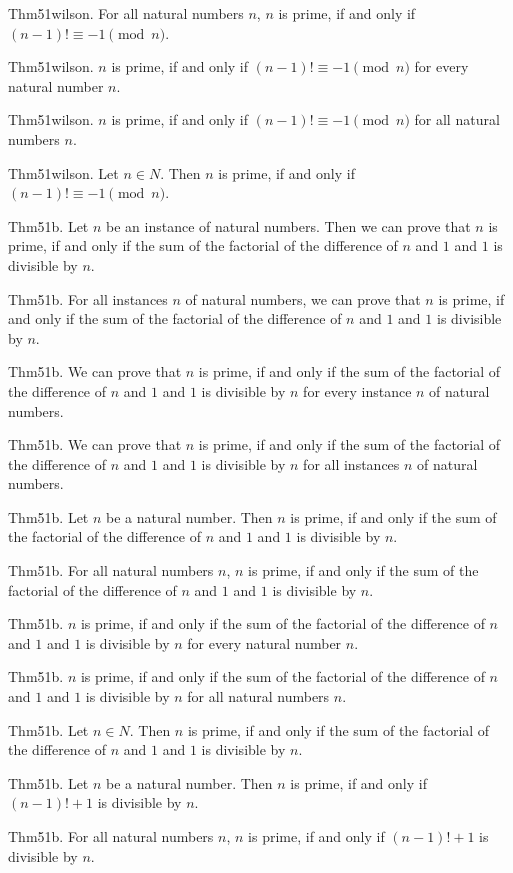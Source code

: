 \documentclass{article}
\begin{document}
Thm51wilson. For all natural numbers $n$, $n$ is prime, if and only if $(n - 1)! \equiv - 1 \pmod{ n}$.

Thm51wilson. $n$ is prime, if and only if $(n - 1)! \equiv - 1 \pmod{ n}$ for every natural number $n$.

Thm51wilson. $n$ is prime, if and only if $(n - 1)! \equiv - 1 \pmod{ n}$ for all natural numbers $n$.

Thm51wilson. Let $n \in N$. Then $n$ is prime, if and only if $(n - 1)! \equiv - 1 \pmod{ n}$.

Thm51b. Let $n$ be an instance of natural numbers. Then we can prove that $n$ is prime, if and only if the sum of the factorial of the difference of $n$ and $1$ and $1$ is divisible by $n$.

Thm51b. For all instances $n$ of natural numbers, we can prove that $n$ is prime, if and only if the sum of the factorial of the difference of $n$ and $1$ and $1$ is divisible by $n$.

Thm51b. We can prove that $n$ is prime, if and only if the sum of the factorial of the difference of $n$ and $1$ and $1$ is divisible by $n$ for every instance $n$ of natural numbers.

Thm51b. We can prove that $n$ is prime, if and only if the sum of the factorial of the difference of $n$ and $1$ and $1$ is divisible by $n$ for all instances $n$ of natural numbers.

Thm51b. Let $n$ be a natural number. Then $n$ is prime, if and only if the sum of the factorial of the difference of $n$ and $1$ and $1$ is divisible by $n$.

Thm51b. For all natural numbers $n$, $n$ is prime, if and only if the sum of the factorial of the difference of $n$ and $1$ and $1$ is divisible by $n$.

Thm51b. $n$ is prime, if and only if the sum of the factorial of the difference of $n$ and $1$ and $1$ is divisible by $n$ for every natural number $n$.

Thm51b. $n$ is prime, if and only if the sum of the factorial of the difference of $n$ and $1$ and $1$ is divisible by $n$ for all natural numbers $n$.

Thm51b. Let $n \in N$. Then $n$ is prime, if and only if the sum of the factorial of the difference of $n$ and $1$ and $1$ is divisible by $n$.

Thm51b. Let $n$ be a natural number. Then $n$ is prime, if and only if $(n - 1)! + 1$ is divisible by $n$.

Thm51b. For all natural numbers $n$, $n$ is prime, if and only if $(n - 1)! + 1$ is divisible by $n$.
\end{document}
